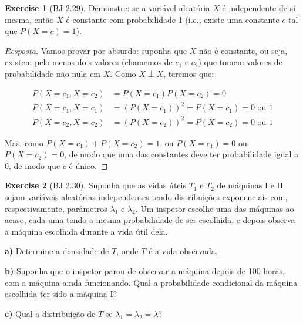 \documentclass[
]{article}
\theoremstyle{definition}
\theoremstyle{definition}
\theoremstyle{definition}
\newtheorem{exercise}{Exercise}[section]
\theoremstyle{definition}
\theoremstyle{remark}
\begin{document}
\begin{exercise}[BJ 2.29]
Demonstre: se a variável aleatória \(X\) é independente de si mesma, então \(X\) é constante com probabilidade 1 (i.e., existe uma constante \(c\) tal que \(P(X = c) = 1\)).
\end{exercise}

\begin{proof}[Resposta]
Vamos provar por absurdo: suponha que \(X\) não é constante, ou seja, existem pelo menos dois valores (chamemos de \(c_{1}\) e \(c_{2}\)) que tomem valores de probabilidade não nula em \(X\). Como \(X \perp X\), teremos que:

\begin{align*}
P(X = c_{1},X = c_{2}) &= P(X = c_{1})P(X = c_{2}) = 0 \\
P(X = c_{1},X = c_{1}) &= (P(X = c_{1}))^{2} = P(X = c_{1}) = 0 \text{ ou }1 \\
P(X = c_{2},X = c_{2}) &= (P(X = c_{2}))^{2} = P(X = c_{2}) = 0 \text{ ou }1
\end{align*}

Mas, como \(P(X = c_{1}) + P(X = c_{2}) = 1\), ou \(P(X = c_{1}) = 0\) ou \(P(X = c_{2}) = 0\), de modo que uma das constantes deve ter probabilidade igual a 0, de modo que \(c\) é único.
\end{proof}

\begin{exercise}[BJ 2.30]
Suponha que as vidas úteis \(T_{1}\) e \(T_{2}\) de máquinas I e II sejam variáveis aleatórias independentes tendo distribuições exponenciais com, respectivamente, parâmetros \(\lambda_{1}\) e \(\lambda_{2}\). Um inspetor escolhe uma das máquinas ao acaso, cada uma tendo a mesma probabilidade de ser escolhida, e depois observa a máquina escolhida durante a vida útil dela.

\textbf{a)} Determine a densidade de \(T\), onde \(T\) é a vida observada.

\textbf{b)} Suponha que o inspetor parou de observar a máquina depois de 100 horas, com a máquina ainda funcionando. Qual a probabilidade condicional da máquina escolhida ter sido a máquina I?

\textbf{c)} Qual a distribuição de \(T\) se \(\lambda_{1} = \lambda_{2} = \lambda\)?
\end{exercise}
\end{document}
